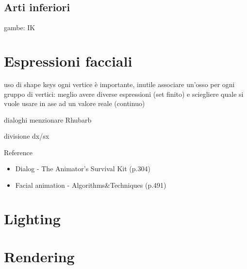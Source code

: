\subsection{Arti inferiori}
gambe: IK
\section{Espressioni facciali}
uso di shape keys
ogni vertice è importante, inutile associare un'osso per ogni gruppo di vertici: meglio avere diverse espressioni (set finito) e sciegliere quale si vuole usare in ase ad un valore reale (continuo)

dialoghi
menzionare Rhubarb

divisione dx/sx

Reference
\begin{itemize}
    \item Dialog - The Animator's Survival Kit (p.304) 
    \item Facial animation - Algorithms\&Techniques (p.491)
\end{itemize}
\section{Lighting}
\section{Rendering}

